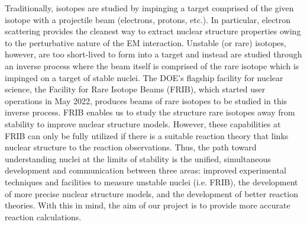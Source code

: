 \documentclass[12pt]{article}
\begin{document}


Traditionally, isotopes are studied by impinging a target comprised of the
given isotope with a projectile beam (electrons, protons, etc.). In particular, electron scattering provides the
cleanest way to extract nuclear structure properties owing to the perturbative nature of the EM interaction. Unstable
(or rare) isotopes, however, are too short-lived to form into a target and instead are studied through an inverse
process where the beam itself is comprised of the rare isotope which is impinged on a target of stable nuclei.  The
DOE's flagship facility for nuclear science, the Facility for Rare Isotope Beams (FRIB), which started user operations
in May 2022, produces beams of rare isotopes to be studied in this inverse process.  
FRIB enables us to study the structure rare isotopes away from stability to improve nuclear structure models. 
However, these capabilities at
FRIB can only be fully utilized if there is a suitable reaction theory that links nuclear structure to the reaction
observations. 
Thus, the path toward understanding nuclei at the limits of stability is the unified,
simultaneous development and communication between three areas: improved experimental techniques and facilities to measure
unstable nuclei (i.e. FRIB), the development of more precise nuclear structure models, and the development of better reaction
theories.
With this in mind, the aim of our project is to provide more accurate reaction calculations.

\end{document}
